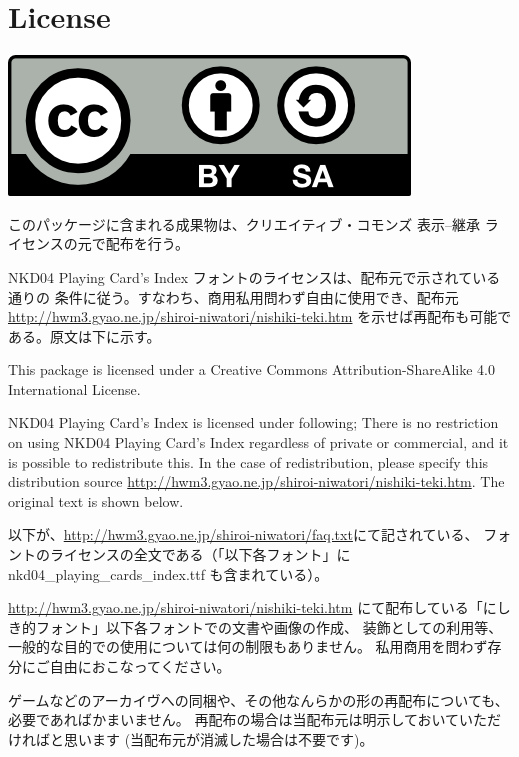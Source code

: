 \documentclass{jlreq}
\begin{document}
\section{License}

\rule{0pt}{0pt}\hfill\includegraphics[height=2\zh]{by-sa.png}\hfill\rule{0pt}{0pt}

このパッケージに含まれる成果物は、クリエイティブ・コモンズ 表示--継承
ライセンスの元で配布を行う。

NKD04 Playing Card's Index フォントのライセンスは、配布元で示されている通りの
条件に従う。すなわち、商用私用問わず自由に使用でき、配布元
\url{http://hwm3.gyao.ne.jp/shiroi-niwatori/nishiki-teki.htm}
を示せば再配布も可能である。原文は下に示す。

This package is licensed under a Creative Commons Attribution-ShareAlike
4.0 International License.

NKD04 Playing Card's Index is licensed under following;
There is no restriction on using NKD04 Playing Card's Index regardless
of private or commercial, and it is possible to redistribute this.
In the case of redistribution, please specify this distribution source
\url{http://hwm3.gyao.ne.jp/shiroi-niwatori/nishiki-teki.htm}.
The original text is shown below.

以下が、\url{http://hwm3.gyao.ne.jp/shiroi-niwatori/faq.txt}にて記されている、
フォントのライセンスの全文である（「以下各フォント」に
nkd04\_playing\_cards\_index.ttf も含まれている）。

\noindent\hspace{1cm}\dotfill\hspace{1cm}

\bgroup\small
\url{http://hwm3.gyao.ne.jp/shiroi-niwatori/nishiki-teki.htm}
にて配布している「にしき的フォント」以下各フォントでの文書や画像の作成、
装飾としての利用等、一般的な目的での使用については何の制限もありません。
私用商用を問わず存分にご自由におこなってください。

ゲームなどのアーカイヴへの同梱や、その他なんらかの形の再配布についても、必要であればかまいません。
再配布の場合は当配布元は明示しておいていただければと思います (当配布元が消滅した場合は不要です)。
\end{document}
